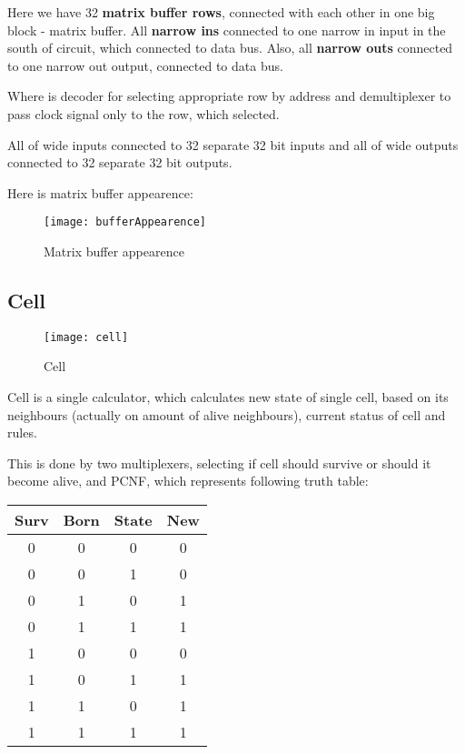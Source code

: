 Here we have 32 \textbf{matrix buffer rows}, connected with each other in one big block - matrix buffer. All \textbf{narrow ins} connected to one narrow in input in the south of circuit, which connected to data bus. Also, all \textbf{narrow outs} connected to one narrow out output, connected to data bus.

Where is decoder for selecting appropriate row by address and demultiplexer to pass clock signal only to the row, which selected.

All of wide inputs connected to 32 separate 32 bit inputs and all of wide outputs connected to 32 separate 32 bit outputs.

\clearpage
Here is matrix buffer appearence:

\begin{figure}[ht]
	\centering
	\texttt{[image: bufferAppearence]}
	\caption{Matrix buffer appearence}
\end{figure}

\subsection*{Cell}

\begin{figure}[!htb]
	\centering
	\texttt{[image: cell]}
	\caption{Cell}
\end{figure}

Cell is a single calculator, which calculates new state of single cell, based on its neighbours (actually on amount of alive neighbours), current status of cell and rules.

This is done by two multiplexers, selecting if cell should survive or should it become alive, and PCNF, which represents following truth table:

\begin{center}
	\begin{tabular}{|c|c|c|c|}
		\hline
		Surv & Born & State & New \\
		\hline
		0 & 0 & 0 & 0  \\
		\hline
		0 & 0 & 1 & 0 \\
		\hline
		0 & 1 & 0 & 1 \\
		\hline
		0 & 1 & 1 & 1 \\
		\hline
		1 & 0 & 0 & 0 \\
		\hline
		1 & 0 & 1 & 1 \\
		\hline
		1 & 1 & 0 & 1 \\
		\hline
		1 & 1 & 1 & 1 \\
		\hline
	\end{tabular}
\end{center}

